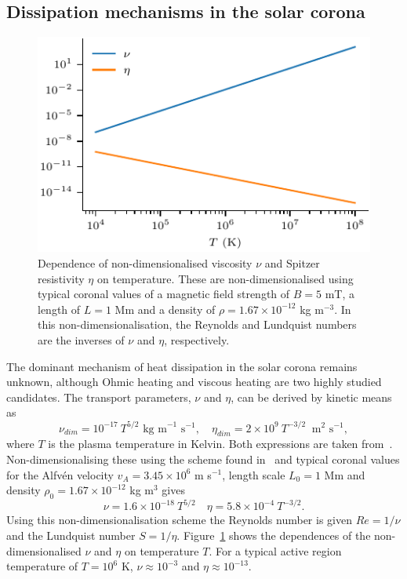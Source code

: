 \subsection{Dissipation mechanisms in the solar corona}

\begin{figure}[t]
  \centering
  \includegraphics[width=0.5\linewidth]{visc_dep_on_temp.pdf}
  \caption{Dependence of non-dimensionalised viscosity $\nu$ and Spitzer resistivity $\eta$ on temperature. These are non-dimensionalised using typical coronal values of a magnetic field strength of $B = 5$ mT, a length of $L = 1$ Mm and a density of $\rho = 1.67 \times 10^{-12}$ kg m$^{-3}$. In this non-dimensionalisation, the Reynolds and Lundquist numbers are the inverses of $\nu$ and $\eta$, respectively.}
  \label{fig:visc_dep_on_temp}
\end{figure}

The dominant mechanism of heat dissipation in the solar corona remains unknown, although Ohmic heating and viscous heating are two highly studied candidates. The transport parameters, $\nu$ and $\eta$, can be derived by kinetic means as
\begin{equation}
  \label{eq:nu_and_eta}
\nu_{dim} = 10^{-17}\ T^{5/2} \text{ kg m}^{-1}\text{ s}^{-1}, \quad \eta_{dim} = 2\times 10^{9}\ T^{-3/2}\ \text{ m}^2 \text{ s}^{-1},
\end{equation}
where $T$ is the plasma temperature in Kelvin. Both expressions are taken from~\cite{braginskiiTransportProcessesPlasma1965}. Non-dimensionalising these using the scheme found in~\cite{arberStaggeredGridLagrangian2001} and typical coronal values for the Alfv\'en velocity $v_A = 3.45 \times 10^6$ m s$^{-1}$, length scale $L_0 = 1$ Mm and density $\rho_0 = 1.67 \times 10^{-12}$ kg m$^3$ gives
\begin{equation}
  \label{eq:nondim_nu_and_eta}
\nu = 1.6 \times 10^{-18}\ T^{5/2} \quad \eta = 5.8 \times 10^{-4}\ T^{-3/2}.
\end{equation}
Using this non-dimensionalisation scheme the Reynolds number is given $Re = 1/\nu$ and the Lundquist number $S = 1/\eta$. Figure~\ref{fig:visc_dep_on_temp} shows the dependences of the non-dimensionalised $\nu$ and $\eta$ on temperature $T$. For a typical active region temperature of $T = 10^6$ K, $\nu \approx 10^{-3}$ and $\eta \approx 10^{-13}$.

